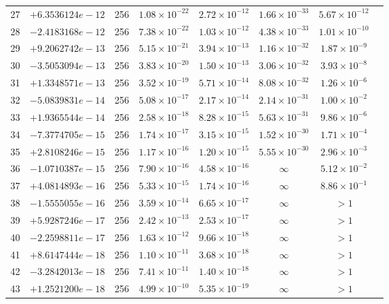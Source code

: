 \documentclass[11pt]{article}
\begin{document}
\begin{longtable}{rlcccccc}
27 & $+6.3536124e-12$ & 256 & $1.08 \times 10^{-22}$ & $2.72 \times 10^{-12}$ & $1.66 \times 10^{-33}$ & $5.67 \times 10^{-12}$ \\
28 & $-2.4183168e-12$ & 256 & $7.38 \times 10^{-22}$ & $1.03 \times 10^{-12}$ & $4.38 \times 10^{-33}$ & $1.01 \times 10^{-10}$ \\
29 & $+9.2062742e-13$ & 256 & $5.15 \times 10^{-21}$ & $3.94 \times 10^{-13}$ & $1.16 \times 10^{-32}$ & $1.87 \times 10^{-9}$ \\
30 & $-3.5053094e-13$ & 256 & $3.83 \times 10^{-20}$ & $1.50 \times 10^{-13}$ & $3.06 \times 10^{-32}$ & $3.93 \times 10^{-8}$ \\
31 & $+1.3348571e-13$ & 256 & $3.52 \times 10^{-19}$ & $5.71 \times 10^{-14}$ & $8.08 \times 10^{-32}$ & $1.26 \times 10^{-6}$ \\
32 & $-5.0839831e-14$ & 256 & $5.08 \times 10^{-17}$ & $2.17 \times 10^{-14}$ & $2.14 \times 10^{-31}$ & $1.00 \times 10^{-2}$ \\
33 & $+1.9365544e-14$ & 256 & $2.58 \times 10^{-18}$ & $8.28 \times 10^{-15}$ & $5.63 \times 10^{-31}$ & $9.86 \times 10^{-6}$ \\
34 & $-7.3774705e-15$ & 256 & $1.74 \times 10^{-17}$ & $3.15 \times 10^{-15}$ & $1.52 \times 10^{-30}$ & $1.71 \times 10^{-4}$ \\
35 & $+2.8108246e-15$ & 256 & $1.17 \times 10^{-16}$ & $1.20 \times 10^{-15}$ & $5.55 \times 10^{-30}$ & $2.96 \times 10^{-3}$ \\
\midrule
36 & $-1.0710387e-15$ & 256 & $7.90 \times 10^{-16}$ & $4.58 \times 10^{-16}$ & $\infty$ & $5.12 \times 10^{-2}$ \\
37 & $+4.0814893e-16$ & 256 & $5.33 \times 10^{-15}$ & $1.74 \times 10^{-16}$ & $\infty$ & $8.86 \times 10^{-1}$ \\
38 & $-1.5555055e-16$ & 256 & $3.59 \times 10^{-14}$ & $6.65 \times 10^{-17}$ & $\infty$ & $> 1$ \\
39 & $+5.9287246e-17$ & 256 & $2.42 \times 10^{-13}$ & $2.53 \times 10^{-17}$ & $\infty$ & $> 1$ \\
40 & $-2.2598811e-17$ & 256 & $1.63 \times 10^{-12}$ & $9.66 \times 10^{-18}$ & $\infty$ & $> 1$ \\
41 & $+8.6147444e-18$ & 256 & $1.10 \times 10^{-11}$ & $3.68 \times 10^{-18}$ & $\infty$ & $> 1$ \\
42 & $-3.2842013e-18$ & 256 & $7.41 \times 10^{-11}$ & $1.40 \times 10^{-18}$ & $\infty$ & $> 1$ \\
43 & $+1.2521200e-18$ & 256 & $4.99 \times 10^{-10}$ & $5.35 \times 10^{-19}$ & $\infty$ & $> 1$ \\

\end{longtable}
\end{document}
